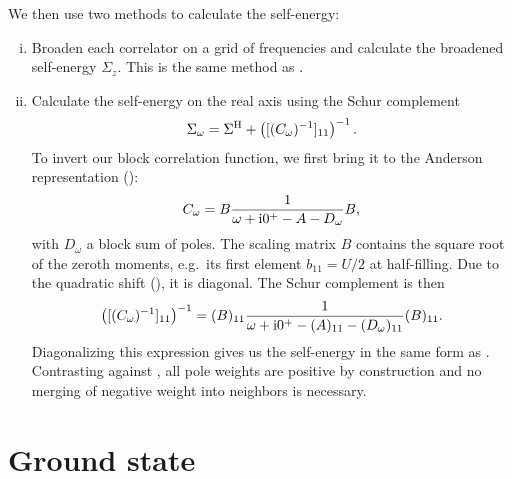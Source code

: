 We then use two methods to calculate the self-energy:
\begin{enumerate}[(i)]
    \item Broaden each correlator on a grid of frequencies
          and calculate the broadened self-energy $\Sigma_z$.
          This is the same method as \cite{Kugler2022}.

    \item Calculate the self-energy on the real axis using the Schur complement \cite{Schur1917}
          \begin{equation}
              \Sigma_\omega = \Sigma^{\mathrm{H}} + \left([(C_\omega)^{-1}]_{11}\right)^{-1}.
          \end{equation}
          To invert our block correlation function, we first bring it to
          the Anderson representation ():
          \begin{equation}
              C_\omega = B\frac{1}{\omega + \mathrm{i}0^+ - A - D_\omega}B,
          \end{equation}
          with $D_\omega$ a block sum of poles.
          The scaling matrix $B$ contains the square root of the zeroth moments,
          e.g.\ its first element $b_{11} = U/2$ at half-filling.
          Due to the quadratic shift (), it is diagonal.
          The Schur complement is then
          \begin{equation}
              \left([(C_\omega)^{-1}]_{11}\right)^{-1}
              =
              (B)_{11} \frac{1}{\omega + \mathrm{i}0^+ - (A)_{11} - (D_\omega)_{11}} (B)_{11}.
          \end{equation}
          Diagonalizing this expression gives us the self-energy in the same form as
          .
          Contrasting against ,
          all pole weights are positive by construction
          and no merging of negative weight into neighbors is necessary.
\end{enumerate}

\section{Ground state}

